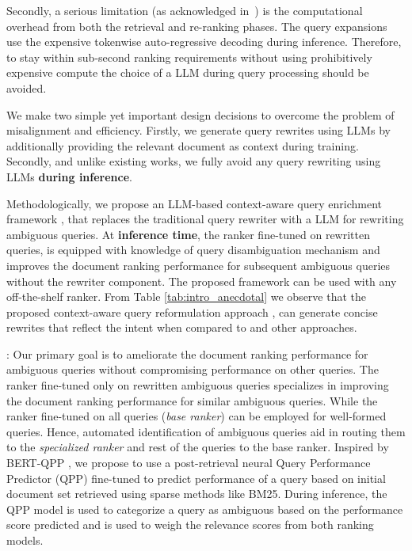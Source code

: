 Secondly, a serious limitation (as acknowledged  in~\cite{wang2023query2doc}) is the computational overhead from both the retrieval and re-ranking phases.
The query expansions use the expensive tokenwise auto-regressive decoding during inference. Therefore, to stay within sub-second ranking requirements without using prohibitively expensive compute the choice of a LLM during query processing should be avoided.


We make two simple yet important design decisions to overcome the problem of misalignment and efficiency.
Firstly, we generate query rewrites using LLMs by additionally providing the relevant document as context during training. 
Secondly, and unlike existing works, we fully avoid any query rewriting using LLMs \textbf{during inference}. 

Methodologically, we propose an LLM-based context-aware query enrichment framework \car{}, that replaces the traditional query rewriter with a LLM for rewriting ambiguous queries. 
At \textbf{inference time}, the ranker fine-tuned on rewritten queries, is equipped with knowledge of query disambiguation mechanism and improves the document ranking performance for subsequent ambiguous queries without the rewriter component. The proposed framework can be used with any off-the-shelf ranker. 
From Table \ref{tab:intro_anecdotal} we observe that the proposed context-aware query reformulation approach \car{}, can generate concise rewrites that reflect the intent when compared to \qd{} and other approaches. 


: Our primary goal is to ameliorate the document ranking performance for ambiguous queries without compromising performance on other queries. The ranker fine-tuned only on rewritten ambiguous queries specializes in improving the document ranking performance for similar ambiguous queries. While the ranker fine-tuned on all queries (\textit{base ranker}) can be employed for well-formed queries. Hence, automated identification of ambiguous queries aid in routing them to the \textit{specialized ranker} and rest of the queries to the base ranker. Inspired by BERT-QPP \cite{bert_qpp}, we propose to use a post-retrieval neural Query Performance Predictor (QPP) fine-tuned to predict performance of a query based on initial document set retrieved using sparse methods like BM25. During inference, the QPP model is used to categorize a query as ambiguous based on the performance score predicted and is used to weigh the relevance scores from both ranking models.


